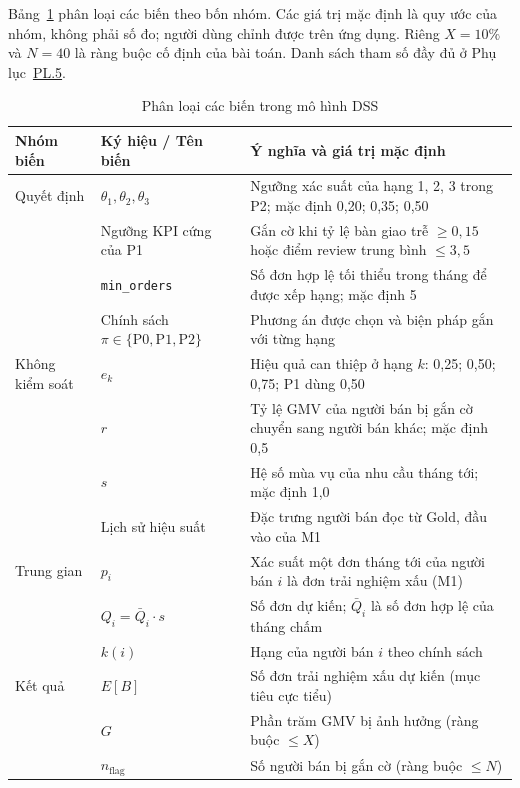 \documentclass[a4paper]{article}
\begin{document}
Bảng~\ref{tab:dss_variables} phân loại các biến theo bốn nhóm. Các giá trị mặc định là quy ước của nhóm, không phải số đo; người dùng chỉnh được trên ứng dụng. Riêng $X = 10\%$ và $N = 40$ là ràng buộc cố định của bài toán. Danh sách tham số đầy đủ ở Phụ lục~\hyperref[pl:5]{PL.5}.

\begin{table}[htbp]
\centering
\footnotesize
\setlength{\tabcolsep}{3pt}
\renewcommand{\arraystretch}{1.1}
\caption{Phân loại các biến trong mô hình DSS}
\label{tab:dss_variables}
\begin{tabularx}{\textwidth}{@{}>{\raggedright\arraybackslash}p{2.3cm}>{\raggedright\arraybackslash}p{5.0cm}>{\raggedright\arraybackslash}X@{}}
\toprule
\textbf{Nhóm biến} & \textbf{Ký hiệu / Tên biến} & \textbf{Ý nghĩa và giá trị mặc định} \\
\midrule
Quyết định & $\theta_1, \theta_2, \theta_3$ & Ngưỡng xác suất của hạng 1, 2, 3 trong P2; mặc định 0,20; 0,35; 0,50 \\
 & Ngưỡng KPI cứng của P1 & Gắn cờ khi tỷ lệ bàn giao trễ $\ge 0{,}15$ hoặc điểm review trung bình $\le 3{,}5$ \\
 & \texttt{min\_orders} & Số đơn hợp lệ tối thiểu trong tháng để được xếp hạng; mặc định 5 \\
 & Chính sách $\pi \in \{\text{P0}, \text{P1}, \text{P2}\}$ & Phương án được chọn và biện pháp gắn với từng hạng \\
\addlinespace
Không kiểm soát & $e_k$ & Hiệu quả can thiệp ở hạng $k$: 0,25; 0,50; 0,75; P1 dùng 0,50 \\
 & $r$ & Tỷ lệ GMV của người bán bị gắn cờ chuyển sang người bán khác; mặc định 0,5 \\
 & $s$ & Hệ số mùa vụ của nhu cầu tháng tới; mặc định 1,0 \\
 & Lịch sử hiệu suất & Đặc trưng người bán đọc từ Gold, đầu vào của M1 \\
\addlinespace
Trung gian & $p_i$ & Xác suất một đơn tháng tới của người bán $i$ là đơn trải nghiệm xấu (M1) \\
 & $Q_i = \bar{Q}_i \cdot s$ & Số đơn dự kiến; $\bar{Q}_i$ là số đơn hợp lệ của tháng chấm \\
 & $k(i)$ & Hạng của người bán $i$ theo chính sách \\
\addlinespace
Kết quả & $E[B]$ & Số đơn trải nghiệm xấu dự kiến (mục tiêu cực tiểu) \\
 & $G$ & Phần trăm GMV bị ảnh hưởng (ràng buộc $\le X$) \\
 & $n_{\text{flag}}$ & Số người bán bị gắn cờ (ràng buộc $\le N$) \\
\bottomrule
\end{tabularx}
\end{table}
\end{document}

